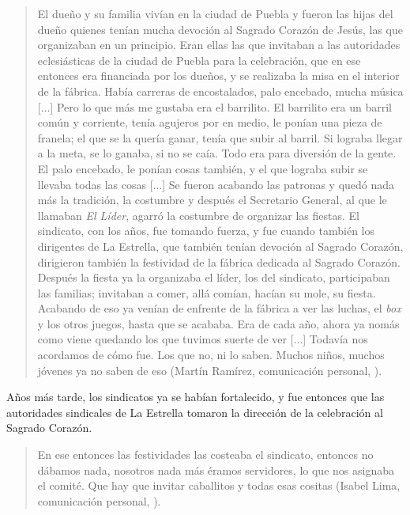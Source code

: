 \documentclass[14pt,letterpaper,twoside]{extbook} %
\begin{document}
\begin{quotation}
\noindent El dueño y su familia vivían en la ciudad de Puebla y fueron las hijas del dueño quienes tenían mucha devoción al Sagrado Corazón de Jesús, las que organizaban en un principio. Eran ellas las que invitaban a las autoridades eclesiásticas de la ciudad de Puebla para la celebración, que en ese entonces era financiada por los dueños, y se realizaba la misa en el interior de la fábrica. Había carreras de encostalados, palo encebado, mucha música [...] Pero lo que más me gustaba era el barrilito. El barrilito era un barril común y corriente, tenía agujeros por en medio, le ponían una pieza de franela; el que se la quería ganar, tenía que subir al barril. Si lograba llegar a la meta, se lo ganaba, si no se caía. Todo era para diversión de la gente. El palo encebado, le ponían cosas también, y el que lograba subir se llevaba todas las cosas [...] Se fueron acabando las patronas y quedó nada más la tradición, la costumbre y después el Secretario General, al que le llamaban \textit{El Líder}, agarró la costumbre de organizar las fiestas. El sindicato, con los años, fue tomando fuerza, y fue cuando también los dirigentes de La Estrella, que también tenían devoción al Sagrado Corazón, dirigieron también la festividad de la fábrica dedicada al Sagrado Corazón. Después la fiesta ya la organizaba el líder, los del sindicato, participaban las familias; invitaban a comer, allá comían, hacían su mole, su fiesta. Acabando de eso ya venían de enfrente de la fábrica a ver las luchas, el \textit{box} y los otros juegos, hasta que se acababa. Era de cada año, ahora ya nomás como viene quedando los que tuvimos suerte de ver [...] Todavía nos acordamos de cómo fue. Los que no, ni lo saben. Muchos niños, muchos jóvenes ya no saben de eso (Martín Ramírez, comunicación personal, ).
\end{quotation}

\noindent Años más tarde, los sindicatos ya se habían fortalecido, y fue entonces que las autoridades sindicales de La Estrella tomaron la dirección de la celebración al Sagrado Corazón.

\begin{quotation}
\noindent En ese entonces las festividades las costeaba el sindicato, entonces no dábamos nada, nosotros nada más éramos servidores, lo que nos asignaba el comité. Que hay que invitar caballitos y todas esas cositas (Isabel Lima, comunicación personal, ).
\end{quotation}
\end{document}
